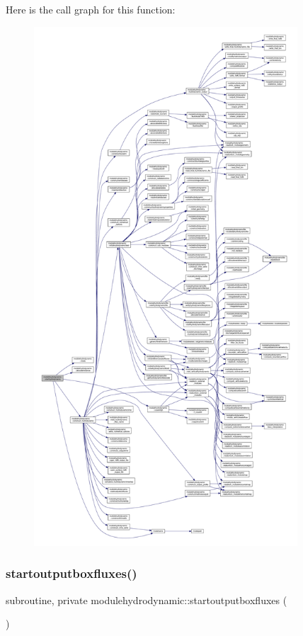 Here is the call graph for this function\+:\nopagebreak
\begin{figure}[H]
\begin{center}
\leavevmode
\includegraphics[height=550pt]{namespacemodulehydrodynamic_a5f577b4eaf3f21452c288af53dcffb69_cgraph}
\end{center}
\end{figure}
\mbox{\label{namespacemodulehydrodynamic_ae7cd830108d9eacfb53fd458817db13d}} 
\subsubsection{\texorpdfstring{startoutputboxfluxes()}{startoutputboxfluxes()}}
{\footnotesize\ttfamily subroutine, private modulehydrodynamic\+::startoutputboxfluxes (\begin{DoxyParamCaption}{ }\end{DoxyParamCaption})\hspace{0.3cm}{\ttfamily [private]}}

